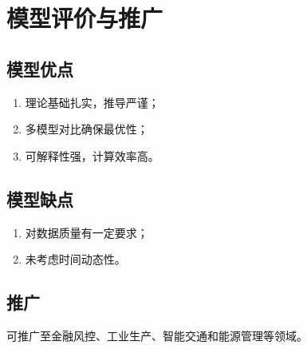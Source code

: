\section{模型评价与推广}

\subsection{模型优点}

\begin{enumerate}
  \item 理论基础扎实，推导严谨；
  \item 多模型对比确保最优性；
  \item 可解释性强，计算效率高。
\end{enumerate}

\subsection{模型缺点}

\begin{enumerate}
  \item 对数据质量有一定要求；
  \item 未考虑时间动态性。
\end{enumerate}

\subsection{推广}

可推广至金融风控、工业生产、智能交通和能源管理等领域。
